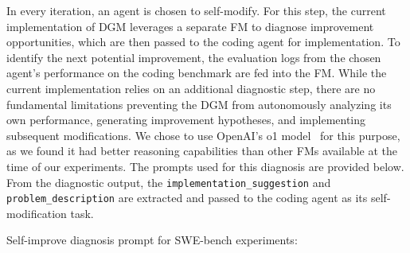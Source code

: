 \documentclass{article}
\begin{document}
In every iteration, an agent is chosen to self-modify. For this step, the current implementation of DGM leverages a separate FM to diagnose improvement opportunities, which are then passed to the coding agent for implementation. To identify the next potential improvement, the evaluation logs from the chosen agent's performance on the coding benchmark are fed into the FM. While the current implementation relies on an additional diagnostic step, there are no fundamental limitations preventing the DGM from autonomously analyzing its own performance, generating improvement hypotheses, and implementing subsequent modifications. We chose to use OpenAI's o1 model~\citep{openai2024o1} for this purpose, as we found it had better reasoning capabilities than other FMs available at the time of our experiments. The prompts used for this diagnosis are provided below. From the diagnostic output, the \texttt{implementation\_suggestion} and \texttt{problem\_description} are extracted and passed to the coding agent as its self-modification task.

Self-improve diagnosis prompt for SWE-bench experiments:
\end{document}
